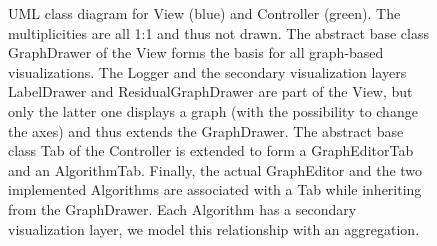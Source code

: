 \begin{figure}
\caption{UML class diagram for View (blue) and Controller (green). The multiplicities are all 1:1 and thus not drawn. The abstract base class GraphDrawer of the View forms the basis for all graph-based visualizations. The Logger and the secondary visualization layers LabelDrawer and ResidualGraphDrawer are part of the View, but only the latter one displays a graph (with the possibility to change the axes) and thus extends the GraphDrawer. The abstract base class Tab of the Controller is extended to form a GraphEditorTab and an AlgorithmTab. Finally, the actual GraphEditor and the two implemented Algorithms are associated with a Tab while inheriting from the GraphDrawer. Each Algorithm has a secondary visualization layer, we model this relationship with an aggregation.}
\end{figure}
